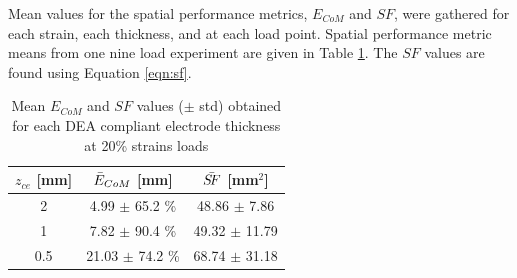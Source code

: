 	Mean values for the spatial performance metrics, $E_{CoM}$ and $S\!F$, were gathered for each strain, each thickness, and at each load point. Spatial performance metric means from one nine load experiment are given in Table \ref{tab:spatial_metrics}. The $S\!F$ values are found using Equation \ref{eqn:sf}.
	\begin{table}[H]
		\centering
		\caption{Mean $E_{CoM}$ and $S\!F$ values ($\pm$ std) obtained for each DEA compliant electrode thickness at 20\% strains loads}
		\label{tab:spatial_metrics}
		\begin{tabular}{c|c|c}
			$z_{ce}$ [mm] & $\Bar{E}_{CoM}$ [mm] & $\Bar{S\!F}$ [mm$^2$] \\
			\hline
			2 & 4.99 $\pm$ 65.2 \% & 48.86 $\pm$ 7.86\\ %
			1 & 7.82 $\pm$ 90.4 \% & 49.32 $\pm$ 11.79\\
			0.5 & 21.03 $\pm$ 74.2 \% & 68.74 $\pm$ 31.18\\
		\end{tabular}
	\end{table}

